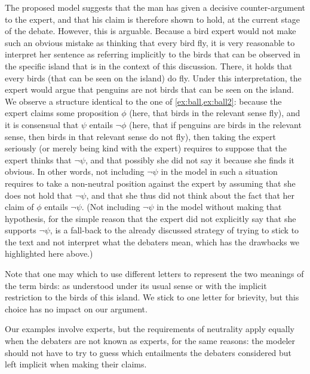 \documentclass[version=3.21, pagesize, twoside=off, bibliography=totoc, DIV=calc, fontsize=12pt, a4paper, french, english]{scrartcl}
\begin{document}
The proposed model suggests that the man has given a decisive counter-argument to the expert, and that his claim is therefore shown to hold, at the current stage of the debate. However, this is arguable. Because a bird expert would not make such an obvious mistake as thinking that every bird fly, it is very reasonable to interpret her sentence as referring implicitly to the birds that can be observed in the specific island that is in the context of this discussion. There, it holds that every birds (that can be seen on the island) do fly. Under this interpretation, the expert would argue that penguins are not birds that can be seen on the island. We observe a structure identical to the one of \cref{ex:ball,ex:ball2}: because the expert claims some proposition $\phi$ (here, that birds in the relevant sense fly), and it is consensual that $\psi$ entails $¬\phi$ (here, that if penguins are birds in the relevant sense, then birds in that relevant sense do not fly), then taking the expert seriously (or merely being kind with the expert) requires to suppose that the expert thinks that $¬\psi$, and that possibly she did not say it because she finds it obvious. In other words, not including $¬\psi$ in the model in such a situation requires to take a non-neutral position against the expert by assuming that she does not hold that $¬\psi$, and that she thus did not think about the fact that her claim of $\phi$ entails $¬\psi$. (Not including $¬\psi$ in the model without making that hypothesis, for the simple reason that the expert did not explicitly say that she supports $¬\psi$, is a fall-back to the already discussed strategy of trying to stick to the text and not interpret what the debaters mean, which has the drawbacks we highlighted here above.)

Note that one may which to use different letters to represent the two meanings of the term birds: as understood under its usual sense or with the implicit restriction to the birds of this island. We stick to one letter for brievity, but this choice has no impact on our argument.

Our examples involve experts, but the requirements of neutrality apply equally when the debaters are not known as experts, for the same reasons: the modeler should not have to try to guess which entailments the debaters considered but left implicit when making their claims.
\end{document}
